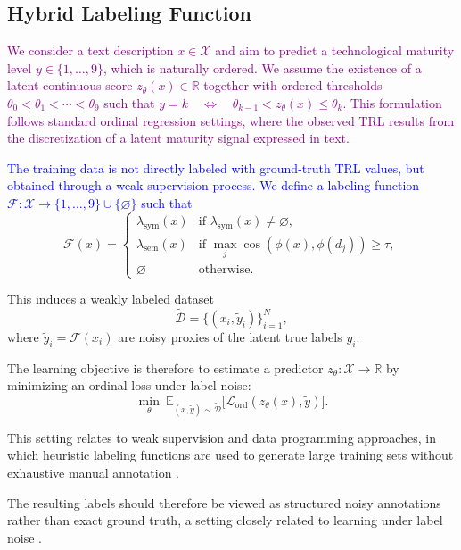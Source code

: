\documentclass[runningheads]{llncs}
\begin{document}
\subsection{Hybrid Labeling Function}
\label{sec:hybrid}
\textcolor{purple}{We consider a text description $x \in \mathcal{X}$ and aim to predict a technological maturity level $y \in \{1,\dots,9\}$, which is naturally ordered. We assume the existence of a latent continuous score $z_\theta(x)\in\mathbb{R}$ together with ordered thresholds $\theta_0 < \theta_1 < \cdots < \theta_9$ such that
\(
y = k \quad \Longleftrightarrow \quad \theta_{k-1} < z_\theta(x) \le \theta_k.
\)
This formulation follows standard ordinal regression settings, where the observed TRL results from the discretization of a latent maturity signal expressed in text.}


\textcolor{blue}{The training data is not directly labeled with ground-truth TRL values, but obtained through a weak supervision process. We define a labeling function $\mathcal{F} : \mathcal{X} \rightarrow \{1,\dots,9\} \cup \{\varnothing\}$ such that }
\color{blue}
\[
\mathcal{F}(x) =
\begin{cases}
\lambda_{\text{sym}}(x) & \text{if } \lambda_{\text{sym}}(x) \neq \varnothing, \\
\lambda_{\text{sem}}(x) & \text{if } \max_j \cos(\phi(x),\phi(d_j)) \ge \tau, \\
\varnothing & \text{otherwise}.
\end{cases}
\]

This induces a weakly labeled dataset
\[
\tilde{\mathcal{D}} = \{(x_i, \tilde{y}_i)\}_{i=1}^N,
\]
where $\tilde{y}_i = \mathcal{F}(x_i)$ are noisy proxies of the latent true labels $y_i$.

The learning objective is therefore to estimate a predictor $z_\theta : \mathcal{X} \rightarrow \mathbb{R}$ by minimizing an ordinal loss under label noise:
\[
\min_\theta \ \mathbb{E}_{(x,\tilde{y}) \sim \tilde{\mathcal{D}}}
\big[\mathcal{L}_{\text{ord}}(z_\theta(x), \tilde{y})\big].
\]   

This setting relates to weak supervision and data programming approaches, in which heuristic labeling functions are used to generate large training sets without exhaustive manual annotation \cite{ratner2017snorkel}.

The resulting labels should therefore be viewed as structured noisy annotations rather than exact ground truth, a setting closely related to learning under label noise \cite{frenay2014labelnoise}.
\end{document}
